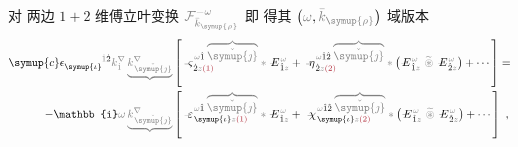对  两边 $1+2$ 维傅立叶变换 $\mathcolor{gray}{\mathcal F_{\bar{k}_{\symup{\rho}}}^{-\omega}}$ 即  得其 $\left( \mathcolor{gray}{\omega}, \mathcolor{gray}{\bar{k}_{\symup{\rho}}} \right)$ 域版本
\begin{subequations}
\begin{align}
	{\symup{c}} \epsilon^{\hphantom{\symup{\iota}}\mathcolor{gray}{\dot{1}}\dot{2}}_{\symup{\iota}} \mathcolor{gray}{k^\nabla_{\dot{1}}} \mathcolor{gray}{\underbrace{k^\nabla_{\;\! \check{\symup{\jmath}}}}} &\left[ \Xint{\begin{smallmatrix} ~ \\ {}^{}_{\mathcolor{gray}{-}} \\ ~ \end{smallmatrix}}{13}{\varsigma}^{\;\! \mathcolor{gray}{\omega} \hat{1} \;\! \mathcolor{gray}{\overbrace{\check{\symup{\jmath}}}}}_{\;\! \dot{2} \mathcolor{gray}{z} \textcolor{Maroon}{(1)}} \mathcolor{gray}{*} \Xint{\mathcolor{gray}{-}}{295}{E}^{\;\!\mathcolor{gray}{\omega}}_{\;\! \hat{1} \mathcolor{gray}{z}} + \Xint{\begin{smallmatrix} ~ \\ {}^{}_{\mathcolor{gray}{-}} \\ ~ \end{smallmatrix}}{17}{\eta}^{\;\! \mathcolor{gray}{\omega} \hat{1} \hat{2} \;\! \mathcolor{gray}{\overbrace{\check{\symup{\jmath}}}}}_{\;\! \dot{2} \mathcolor{gray}{z} \textcolor{Maroon}{(2)}} \mathcolor{gray}{*} \left( \Xint{\mathcolor{gray}{-}}{295}{E}^{\;\!\mathcolor{gray}{\omega}}_{\;\! \hat{1} \mathcolor{gray}{z}} ~\mathcolor{gray}{\widetilde \circledast}~ \Xint{\mathcolor{gray}{-}}{295}{E}^{\;\!\mathcolor{gray}{\omega}}_{\;\! \hat{2} \mathcolor{gray}{z}} \right) + \cdots \right] \label{eq:wave_wkrho} = \\
	- \mathbb{i} \mathcolor{gray}{\omega} \mathcolor{gray}{\underbrace{k^\nabla_{\;\! \check{\symup{\jmath}}}}} &\left[ \Xint{\begin{smallmatrix} ~ \\ {}^{}_{\mathcolor{gray}{-}} \\ ~ \end{smallmatrix}}{16}{\varepsilon}^{\;\! \mathcolor{gray}{\omega} \hat{1} \;\! \mathcolor{gray}{\overbrace{\check{\symup{\jmath}}}}}_{\;\! \symup{\iota} \mathcolor{gray}{z} \textcolor{Maroon}{(1)}} \mathcolor{gray}{*} \Xint{\mathcolor{gray}{-}}{295}{E}^{\;\!\mathcolor{gray}{\omega}}_{\;\! \hat{1} \mathcolor{gray}{z}} + ~\Xint{{}^{}_{\mathcolor{gray}{-}}}{23}{\chi}^{\;\! \mathcolor{gray}{\omega} \hat{1} \hat{2} \;\! \mathcolor{gray}{\overbrace{\check{\symup{\jmath}}}}}_{\;\! \symup{\iota} \mathcolor{gray}{z} \textcolor{Maroon}{(2)}} \mathcolor{gray}{*} \left( \Xint{\mathcolor{gray}{-}}{295}{E}^{\;\!\mathcolor{gray}{\omega}}_{\;\! \hat{1} \mathcolor{gray}{z}} ~\mathcolor{gray}{\widetilde \circledast}~ \Xint{\mathcolor{gray}{-}}{295}{E}^{\;\!\mathcolor{gray}{\omega}}_{\;\! \hat{2} \mathcolor{gray}{z}} \right) + \cdots \right]~,
\end{align}
\end{subequations}
